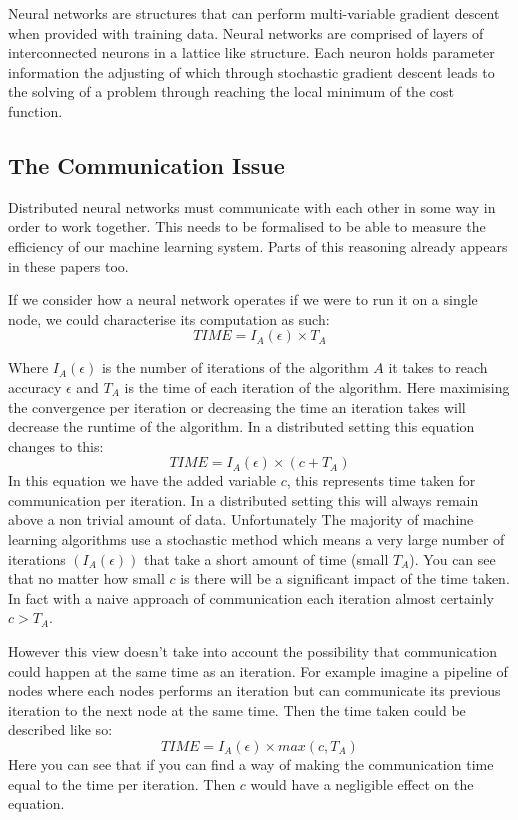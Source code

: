 Neural networks are structures that can perform multi-variable gradient descent
when provided with training data. Neural networks are comprised of layers of
interconnected neurons in a lattice like structure. Each neuron holds parameter
information the adjusting of which through stochastic gradient descent leads to
the solving of a problem through reaching the local minimum of the cost
function.

\subsection{The Communication Issue}
Distributed neural networks must communicate with each other in some way in
order to work together. This needs to be formalised to be able to measure the
efficiency of our machine learning system. Parts of this reasoning already
appears in these papers too. \cite{konevcny2016federated ,Ma2017DistributedOptimisation}

If we consider how a neural network operates if we were to run it on a single
node, we could characterise its computation as such:
\begin{equation}
    TIME = I_A (\epsilon) \times T_A 
\end{equation}

Where \(I_A(\epsilon)\) is the number of iterations of the algorithm \(A\) it
takes to reach accuracy \(\epsilon\) and \(T_A\) is the time of each iteration
of the algorithm. Here maximising the convergence per iteration or decreasing
the time an iteration takes will decrease the runtime of the algorithm. In a
distributed setting this equation changes to this:
\begin{equation}
    TIME = I_A (\epsilon) \times (c + T_A)  
\end{equation}
In this equation we have the added variable \(c\), this represents time taken
for communication per iteration. In a distributed setting this will always
remain above a non trivial amount of data. Unfortunately The majority of machine
learning algorithms use a stochastic method which means a very large number of
iterations \((I_A(\epsilon))\) that take a short amount of time (small \(T_A\)).
You can see that no matter how small \(c\) is there will be a significant impact
of the time taken. In fact with a naive approach of communication each iteration
almost certainly \(c > T_A\).

However this view doesn't take into account the possibility that communication
could happen at the same time as an iteration. For example imagine a pipeline of
nodes where each nodes performs an iteration but can communicate its previous
iteration to the next node at the same time. Then the time taken could be
described like so:
\begin{equation}
    TIME = I_A (\epsilon) \times max(c, T_A)
\end{equation}
Here you can see that if you can find a way of making the communication time
equal to the time per iteration. Then \(c\) would have a negligible effect on
the equation.

